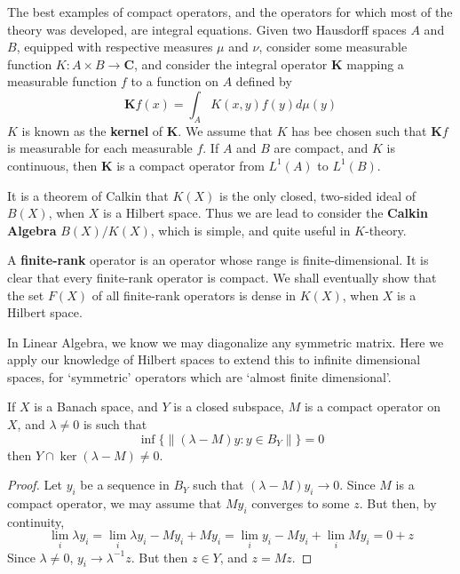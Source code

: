 \begin{example}
    The best examples of compact operators, and the operators for which most of the theory was developed, are integral equations. Given two Hausdorff spaces $A$ and $B$, equipped with respective measures $\mu$ and $\nu$, consider some measurable function $K: A \times B \to \mathbf{C}$, and consider the integral operator $\mathbf{K}$ mapping a measurable function $f$ to a function on $A$ defined by
    \[ \mathbf{K}f(x) = \int_A K(x,y) f(y) d \mu(y) \]
    $K$ is known as the {\bf kernel} of $\mathbf{K}$. We assume that $K$ has bee chosen such that $\mathbf{K}f$ is measurable for each measurable $f$. If $A$ and $B$ are compact, and $K$ is continuous, then $\mathbf{K}$ is a compact operator from $L^1(A)$ to $L^1(B)$.
\end{example}

It is a theorem of Calkin that $K(X)$ is the only closed, two-sided ideal of $B(X)$, when $X$ is a Hilbert space. Thus we are lead to consider the {\bf Calkin Algebra} $B(X)/K(X)$, which is simple, and quite useful in $K$-theory.

A {\bf finite-rank} operator is an operator whose range is finite-dimensional. It is clear that every finite-rank operator is compact. We shall eventually show that the set $F(X)$ of all finite-rank operators is dense in $K(X)$, when $X$ is a Hilbert space.



\newpage

In Linear Algebra, we know we may diagonalize any symmetric matrix. Here we apply our knowledge of Hilbert spaces to extend this to infinite dimensional spaces, for `symmetric' operators which are `almost finite dimensional'.

\begin{theorem}
    If $X$ is a Banach space, and $Y$ is a closed subspace, $M$ is a compact operator on $X$, and $\lambda \neq 0$ is such that
    \[ \inf \{ \| (\lambda - M)y : y \in B_Y \| \} = 0 \]
    then $Y \cap \ker(\lambda - M) \neq 0$.
\end{theorem}
\begin{proof}
    Let $y_i$ be a sequence in $B_Y$ such that $(\lambda - M)y_i \to 0$. Since $M$ is a compact operator, we may assume that $My_i$ converges to some $z$. But then, by continuity,
    \[ \lim_i \lambda y_i = \lim_i \lambda y_i - M y_i + M y_i = \lim_i y_i - M y_i + \lim_i M y_i = 0 + z \]
    Since $\lambda \neq 0$, $y_i \to \lambda^{-1} z$. But then $z \in Y$, and $z = Mz$.
\end{proof}

